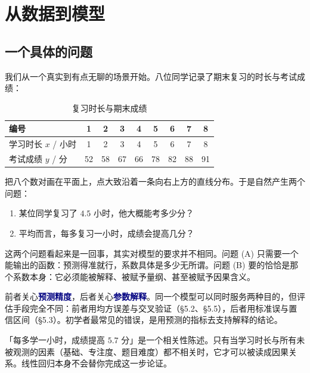 \documentclass[11pt,a4paper,fontset=windows,zihao=-4]{ctexart}
\newcommand{\hl}[1]{\textcolor{navy}{\textbf{#1}}}
\newcommand{\tabhead}{\sffamily\bfseries\color{navy}}
\begin{document}

\section{从数据到模型}

\subsection{一个具体的问题}

我们从一个真实到有点无聊的场景开始。八位同学记录了期末复习的时长与考试成绩：

\begin{table}[htbp]
\centering
\small
\caption{复习时长与期末成绩}
\label{tab:data}
\begin{tabular}{@{}l*{8}{c}@{}}
\toprule
\rowcolor{navy!7}
\tabhead 编号 & 1 & 2 & 3 & 4 & 5 & 6 & 7 & 8\\
\midrule
学习时长 $x$ / 小时 & 1 & 2 & 3 & 4 & 5 & 6 & 7 & 8\\
考试成绩 $y$ / 分   & 52 & 58 & 67 & 66 & 78 & 82 & 88 & 91\\
\bottomrule
\end{tabular}
\end{table}

把八个数对画在平面上，点大致沿着一条向右上方的直线分布。于是自然产生两个问题：

\begin{enumerate}[label=\textsf{(\Alph*)}]
  \item 某位同学复习了 $4.5$ 小时，他大概能考多少分？
  \item 平均而言，每多复习一小时，成绩会提高几分？
\end{enumerate}

这两个问题看起来是一回事，其实对模型的要求并不相同。问题 \textsf{(A)} 只需要一个能输出的函数：预测得准就行，系数具体是多少无所谓。问题 \textsf{(B)} 要的恰恰是那个系数本身：它必须能被解释、被赋予量纲、甚至被赋予因果含义。

前者关心\hl{预测精度}，后者关心\hl{参数解释}。同一个模型可以同时服务两种目的，但评估手段完全不同：前者用均方误差与交叉验证（\S5.2、\S5.5），后者用标准误与置信区间（\S5.3）。初学者最常见的错误，是用预测的指标去支持解释的结论。

\begin{warn}[系数不是因果]
「每多学一小时，成绩提高 $5.7$ 分」是一个相关性陈述。只有当学习时长与所有未被观测的因素（基础、专注度、题目难度）都不相关时，它才可以被读成因果关系。线性回归本身不会替你完成这一步论证。
\end{warn}
\end{document}
